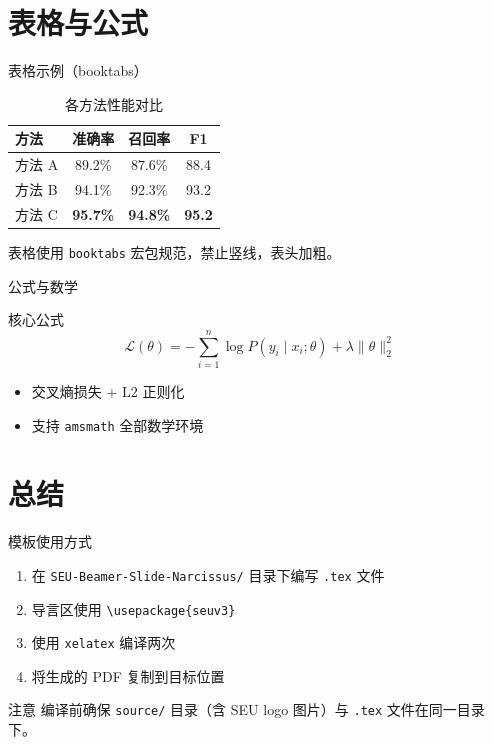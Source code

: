 \documentclass[aspectratio=169, 11pt]{beamer}
\begin{document}
\section{表格与公式}

\begin{frame}{表格示例（booktabs）}
\begin{table}
\centering
\caption{各方法性能对比}
\begin{tabular}{lccc}
\toprule
\textbf{方法} & \textbf{准确率} & \textbf{召回率} & \textbf{F1} \\
\midrule
方法 A & 89.2\% & 87.6\% & 88.4 \\
方法 B & 94.1\% & 92.3\% & 93.2 \\
方法 C & \textbf{95.7\%} & \textbf{94.8\%} & \textbf{95.2} \\
\bottomrule
\end{tabular}
\end{table}

\vspace{0.2cm}

\footnotesize 表格使用 \texttt{booktabs} 宏包规范，禁止竖线，表头加粗。
\end{frame}

\begin{frame}{公式与数学}
\begin{block}{核心公式}
  \begin{equation}
    \mathcal{L}(\theta) = -\sum_{i=1}^{n} \log P(y_i \mid x_i; \theta) + \lambda \|\theta\|_2^2
  \end{equation}
\end{block}

\vspace{0.2cm}

\begin{itemize}
  \item 交叉熵损失 + L2 正则化
  \item 支持 \texttt{amsmath} 全部数学环境
\end{itemize}
\end{frame}

\section{总结}

\begin{frame}{模板使用方式}
\begin{enumerate}
  \item 在 \texttt{SEU-Beamer-Slide-Narcissus/} 目录下编写 \texttt{.tex} 文件
  \item 导言区使用 \texttt{\textbackslash usepackage\{seu\textunderscore v3\}}
  \item 使用 \texttt{xelatex} 编译两次
  \item 将生成的 PDF 复制到目标位置
\end{enumerate}

\vspace{0.3cm}

\begin{alertblock}{注意}
  编译前确保 \texttt{source/} 目录（含 SEU logo 图片）与 \texttt{.tex} 文件在同一目录下。
\end{alertblock}
\end{frame}
\end{document}
